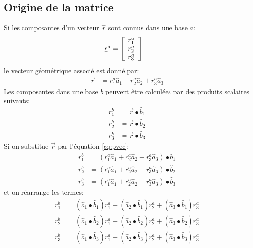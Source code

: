\subsection{Origine de la matrice}
Si les composantes d'un vecteur $\vec{r}$ sont connus dans une base $a$:
\begin{align}
\underline{r}^a &= \left[ \begin{array}{c} r_1^a \\ r_2^a \\ r_3^a  \end{array} \right]
\end{align} 
le vecteur géométrique associé est donné par:
\begin{align}
\vec{r} &= r_1^a \hat{a}_1 + r_2^a \hat{a}_2 + r_3^a \hat{a}_3
\label{eq:pvec}
\end{align} 
Les composantes dans une base $b$ peuvent être calculées par des produits scalaires suivants:
\begin{align}
r_1^b &= \vec{r} \bullet \hat{b}_1 \\
r_2^b &= \vec{r} \bullet \hat{b}_2 \\
r_3^b &= \vec{r} \bullet \hat{b}_3
\end{align} 
Si on substitue $\vec{r}$ par l'équation \eqref{eq:pvec}:
\begin{align}
r_1^b &= (r_1^a \hat{a}_1 + r_2^a \hat{a}_2 + r_3^a \hat{a}_3) \bullet \hat{b}_1 \\
r_2^b &= (r_1^a \hat{a}_1 + r_2^a \hat{a}_2 + r_3^a \hat{a}_3) \bullet \hat{b}_2 \\
r_3^b &= (r_1^a \hat{a}_1 + r_2^a \hat{a}_2 + r_3^a \hat{a}_3) \bullet \hat{b}_3
\end{align} 
et on réarrange les termes:
\begin{align}
r_1^b &= (\hat{a}_1 \bullet \hat{b}_1 ) r_1^a + (\hat{a}_2 \bullet \hat{b}_1 ) r_2^a + (\hat{a}_3 \bullet \hat{b}_1 ) r_3^a \\
r_2^b &= (\hat{a}_1 \bullet \hat{b}_2 ) r_1^a + (\hat{a}_2 \bullet \hat{b}_2 ) r_2^a + (\hat{a}_3 \bullet \hat{b}_2 ) r_3^a \\
r_3^b &= (\hat{a}_1 \bullet \hat{b}_3 ) r_1^a + (\hat{a}_2 \bullet \hat{b}_3 ) r_2^a + (\hat{a}_3 \bullet \hat{b}_3 ) r_3^a 
\end{align} 
